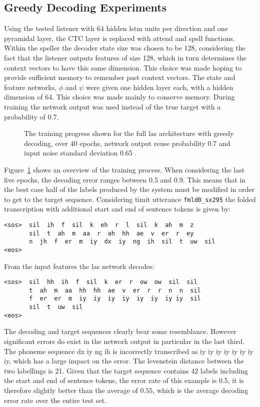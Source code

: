 \subsection{Greedy Decoding Experiments}
\label{sec:greedy}
Using the tested listener with 64 hidden lstm units per direction and one pyramidal layer, the CTC layer is replaced with attend and spell functions. Within the speller the decoder state size was chosen to be 128, considering the fact that the listener outputs features of size 128, which in turn determines the context vectors to have this same dimension. This choice was made hoping to provide sufficient memory to remember past context vectors.
The state and feature networks, $\phi$ and $\psi$ were given one hidden layer each, with a hidden dimension of 64. This choice was made mainly to conserve memory. During training the network output was used instead of the true target with a probability of 0.7.
\begin{figure}


\caption{The training progress shown for the full las architecture with greedy decoding, over 40 epochs, network output reuse probability 0.7 and input noise standard deviation 0.65 .}
\label{fig:lasGreedy}
\end{figure}
Figure~\ref{fig:lasGreedy} shows an overview of the training process. When considering the last five epochs, the decoding error  ranges between 0.5 and 0.9. This means that in the best case half of the labels produced by the system must be modified in order to
get to the target sequence. Considering timit utterance \texttt{fmld0\_sx295} the folded transcription with additional start and end of sentence tokens is given by:
\begin{lstlisting}[caption={Targets}]
<sos>  sil  ih  f  sil  k  eh  r  l  sil  k  ah  m  z
       sil  t  ah  m  aa  r  ah  hh  ae  v  er  r  ey
       n  jh  f  er  m  iy  dx  iy  ng  ih  sil  t  uw  sil
<eos>
\end{lstlisting}
From the input features the las network decodes:
\begin{lstlisting}[caption={Network output}]
<sos>  sil  hh  ih  f  sil  k  er  r  ow  ow  sil  sil
       t  ah  m  aa  hh  hh  ae  v  er  r  r  n  n  sil
       f  er  er  m  iy  iy  iy  iy  iy  iy  iy iy  sil
       sil  t  uw  sil
<eos>
\end{lstlisting}
The decoding and target sequences clearly bear some resemblance. However significant errors do exist in the network output in particular in the last third. The phoneme sequence dx  iy  ng  ih is incorrectly transcribed as iy  iy  iy  iy  iy  iy  iy iy,
which has a large impact on the error. The levenstein distance between the two labellings is 21. Given that the target sequence contains 42 labels including the start and end of sentence tokens, the error rate of this example is 0.5, it is therefore slightly better than the average of $0.55$, which is the average decoding error rate over the entire test set.

